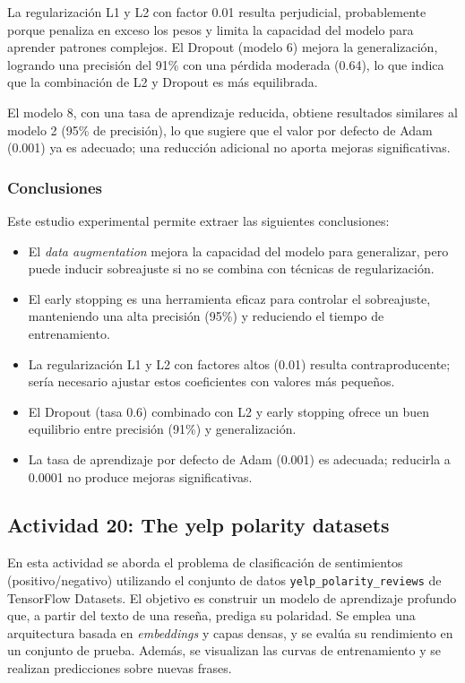 \documentclass[12pt]{article}
\begin{document}
La regularización L1 y L2 con factor 0.01 resulta perjudicial, probablemente porque penaliza en exceso los pesos y limita la capacidad del modelo para aprender patrones complejos. El Dropout (modelo 6) mejora la generalización, logrando una precisión del 91\% con una pérdida moderada (0.64), lo que indica que la combinación de L2 y Dropout es más equilibrada.

El modelo 8, con una tasa de aprendizaje reducida, obtiene resultados similares al modelo 2 (95\% de precisión), lo que sugiere que el valor por defecto de Adam (0.001) ya es adecuado; una reducción adicional no aporta mejoras significativas.

\subsubsection*{Conclusiones}

Este estudio experimental permite extraer las siguientes conclusiones:

\begin{itemize}
    \item El \textit{data augmentation} mejora la capacidad del modelo para generalizar, pero puede inducir sobreajuste si no se combina con técnicas de regularización.
    \item El early stopping es una herramienta eficaz para controlar el sobreajuste, manteniendo una alta precisión (95\%) y reduciendo el tiempo de entrenamiento.
    \item La regularización L1 y L2 con factores altos (0.01) resulta contraproducente; sería necesario ajustar estos coeficientes con valores más pequeños.
    \item El Dropout (tasa 0.6) combinado con L2 y early stopping ofrece un buen equilibrio entre precisión (91\%) y generalización.
    \item La tasa de aprendizaje por defecto de Adam (0.001) es adecuada; reducirla a 0.0001 no produce mejoras significativas.
\end{itemize}

\subsection{Actividad 20: The yelp polarity datasets}

En esta actividad se aborda el problema de clasificación de sentimientos (positivo/negativo) utilizando el conjunto de datos \texttt{yelp\_polarity\_reviews} de TensorFlow Datasets. El objetivo es construir un modelo de aprendizaje profundo que, a partir del texto de una reseña, prediga su polaridad. Se emplea una arquitectura basada en \textit{embeddings} y capas densas, y se evalúa su rendimiento en un conjunto de prueba. Además, se visualizan las curvas de entrenamiento y se realizan predicciones sobre nuevas frases.
\end{document}
